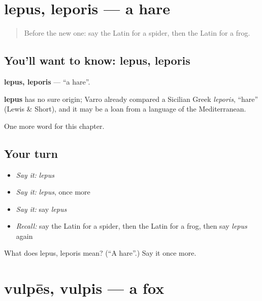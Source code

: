 \section[lepus, leporis]{lepus, leporis — a hare}

\label{lesson:LA-C133-lepus}



\begin{quote}
Before the new one: say the Latin for a spider, then the Latin for a frog.
\end{quote}

\subsection*{You'll want to know: lepus, leporis}
\textbf{lepus, leporis} — \textquotedblleft{}a hare\textquotedblright{}.

\begin{cousinweb}
\textbf{lepus} has no sure origin; Varro already compared a Sicilian Greek \emph{leporis}, \textquotedblleft{}hare\textquotedblright{} (Lewis \& Short), and it may be a loan from a language of the Mediterranean.
\end{cousinweb}

\begin{grammarlens}[title={What you've built}]
One more word for this chapter.
\end{grammarlens}

\subsection*{Your turn}
\begin{itemize}
\raggedright
  \item \emph{Say it:} \emph{lepus}
  \item \emph{Say it:} \emph{lepus}, once more
  \item \emph{Say it:} say \emph{lepus}
  \item \emph{Recall:} say the Latin for a spider, then the Latin for a frog, then say \emph{lepus} again
\end{itemize}

\begin{tcolorbox}[breakable,colback=teal!4,colframe=teal!35!black,title={Before you move on}]
What does lepus, leporis mean? (\textquotedblleft{}A hare\textquotedblright{}.) Say it once more.
\end{tcolorbox}
\section[vulpēs, vulpis]{vulpēs, vulpis — a fox}

